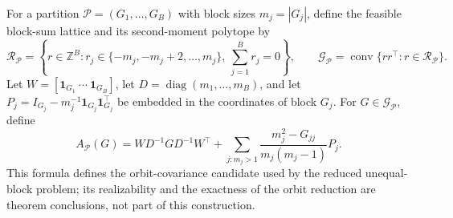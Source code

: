 For a partition \(\mathcal P=(G_1,\ldots,G_B)\) with block sizes \(m_j=|G_j|\), define the feasible block-sum lattice and its second-moment polytope by
\[
\mathcal R_{\mathcal P}
=\left\{r\in\mathbb Z^B:r_j\in\{-m_j,-m_j+2,\ldots,m_j\},\ \sum_{j=1}^B r_j=0\right\},
\qquad
\mathcal G_{\mathcal P}=\operatorname{conv}\{rr^\top:r\in\mathcal R_{\mathcal P}\}.
\]
Let \(W=[\mathbf 1_{G_1}\ \cdots\ \mathbf 1_{G_B}]\), let \(D=\operatorname{diag}(m_1,\ldots,m_B)\), and let \(P_j=I_{G_j}-m_j^{-1}\mathbf 1_{G_j}\mathbf 1_{G_j}^\top\) be embedded in the coordinates of block \(G_j\). For \(G\in\mathcal G_{\mathcal P}\), define
\[
A_{\mathcal P}(G)
=WD^{-1}GD^{-1}W^\top
+\sum_{j:m_j>1}\frac{m_j^2-G_{jj}}{m_j(m_j-1)}P_j.
\]
This formula defines the orbit-covariance candidate used by the reduced unequal-block problem; its realizability and the exactness of the orbit reduction are theorem conclusions, not part of this construction.